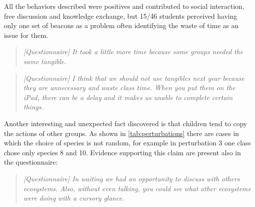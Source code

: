 All the behaviors described were positives and contributed to social interaction, free discussion and knowledge exchange, but 15/46 students perceived having only one set of beacons as a problem often identifying the waste of time as an issue for them.
\begin{quote}
\textit{[Questionnaire]
It took a little more time because some groups needed the same tangible.}
\end{quote}
\begin{quote}
\textit{[Questionnaire]
I think that we should not use tangibles next year because they are unnecessary and waste class time. When you put them on the iPad, there can be a delay and it makes us unable to complete certain things.}
\end{quote}

Another interesting and unexpected fact discovered is that children tend to copy the actions of other groups. As shown in \ref{tab:perturbations} there are cases in which the choice of species is not random, for example in perturbation 3 one class chose only species 8 and 10. Evidence supporting this claim are present also in the questionnaire:
\begin{quote}
\textit{[Questionnaire]
In waiting we had an opportunity to discuss with others ecosystems. Also, without even talking, you could see what other ecosystems were doing with a cursory glance.}
\end{quote}

